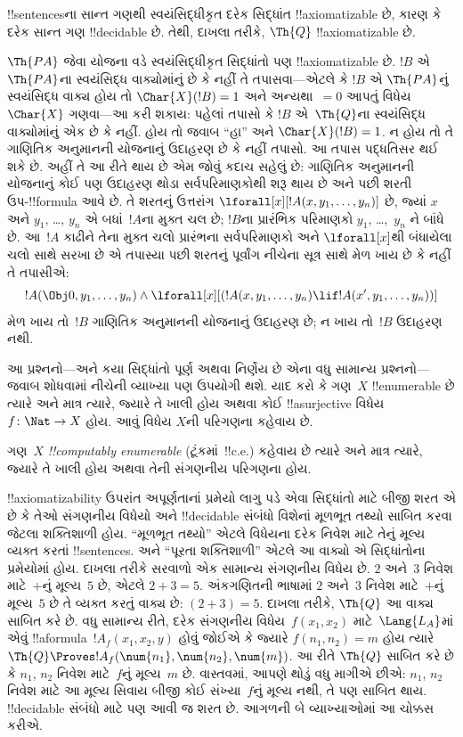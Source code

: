 \documentclass[../../../include/open-logic-section]{subfiles}
\begin{document}
\begin{ex}
!!{sentence}sના સાન્ત ગણથી સ્વયંસિદ્ધીકૃત
દરેક સિદ્ધાંત !!{axiomatizable} છે, કારણ કે
દરેક સાન્ત ગણ !!{decidable} છે. તેથી,
દાખલા તરીકે, $\Th{Q}$ !!{axiomatizable} છે.

$\Th{PA}$ જેવા યોજના વડે સ્વયંસિદ્ધીકૃત
સિદ્ધાંતો પણ !!{axiomatizable} છે. $!B$ એ
$\Th{PA}$ના સ્વયંસિદ્ધ વાક્યોમાંનું છે કે
નહીં તે તપાસવા—એટલે કે $!B$ એ
$\Th{PA}$નું સ્વયંસિદ્ધ વાક્ય હોય તો
$\Char{X}(!B)=1$ અને અન્યથા~$=0$
આપતું વિધેય~$\Char{X}$ ગણવા—આ કરી શકાય:
પહેલાં તપાસો કે $!B$ એ~$\Th{Q}$ના
સ્વયંસિદ્ધ વાક્યોમાંનું એક છે કે નહીં.
હોય તો જવાબ ``હા'' અને
$\Char{X}(!B)=1$. ન હોય તો તે ગાણિતિક અનુમાનની
યોજનાનું ઉદાહરણ છે કે નહીં તપાસો. આ
તપાસ પદ્ધતિસર થઈ શકે છે. અહીં તે આ રીતે
થાય છે એમ જોવું કદાચ સહેલું છે: ગાણિતિક અનુમાનની
યોજનાનું કોઈ પણ ઉદાહરણ થોડા સર્વપરિમાણકોથી
શરૂ થાય છે અને પછી શરતી ઉપ-!!{formula}
આવે છે. તે શરતનું ઉત્તરાંગ
$\lforall[x][!A(x, y_1, \dots, y_n)]$
છે, જ્યાં $x$ અને $y_1$, \dots, $y_n$
એ બધાં~$!A$ના મુક્ત ચલ છે; $!B$ના
પ્રારંભિક પરિમાણકો $y_1$, \dots,~$y_n$
ને બાંધે છે. આ~$!A$ કાઢીને તેના મુક્ત
ચલો પ્રારંભના સર્વપરિમાણકો અને
$\lforall[x]$થી બંધાયેલા ચલો સાથે સરખા
છે એ તપાસ્યા પછી શરતનું પૂર્વાંગ
નીચેના સૂત્ર સાથે મેળ ખાય છે કે નહીં
તે તપાસીએ:
\[
!A(\Obj 0, y_1, \dots, y_n) \land \lforall[x][(!A(x, y_1, \dots, y_n)
\lif !A(x', y_1, \dots, y_n))]
\]
મેળ ખાય તો~$!B$ ગાણિતિક અનુમાનની યોજનાનું
ઉદાહરણ છે; ન ખાય તો~$!B$ ઉદાહરણ નથી.
\end{ex}

આ પ્રશ્નનો—અને કયા સિદ્ધાંતો પૂર્ણ અથવા
નિર્ણેય છે એના વધુ સામાન્ય પ્રશ્નનો—જવાબ
શોધવામાં નીચેની વ્યાખ્યા પણ ઉપયોગી થશે.
યાદ કરો કે ગણ~$X$ !!{enumerable} છે ત્યારે
અને માત્ર ત્યારે, જ્યારે તે ખાલી હોય અથવા
કોઈ !!a{surjective} વિધેય
$f \colon \Nat \to X$ હોય. આવું વિધેય
$X$ની પરિગણના કહેવાય છે.

\begin{defn}
ગણ~$X$ \emph{!!{computably enumerable}}
(ટૂંકમાં~!!{c.e.}) કહેવાય છે ત્યારે અને માત્ર
ત્યારે, જ્યારે તે ખાલી હોય અથવા તેની
સંગણનીય પરિગણના હોય.
\end{defn}

!!{axiomatizability} ઉપરાંત અપૂર્ણતાનાં
પ્રમેયો લાગુ પડે એવા સિદ્ધાંતો માટે બીજી શરત
એ છે કે તેઓ સંગણનીય વિધેયો અને
!!{decidable} સંબંધો વિશેનાં મૂળભૂત તથ્યો
સાબિત કરવા જેટલા શક્તિશાળી હોય. ``મૂળભૂત
તથ્યો'' એટલે વિધેયના દરેક નિવેશ માટે તેનું
મૂલ્ય વ્યક્ત કરતાં !!{sentence}s. અને
``પૂરતા શક્તિશાળી'' એટલે આ વાક્યો એ
સિદ્ધાંતોના પ્રમેયોમાં હોય. દાખલા તરીકે
સરવાળો એક સામાન્ય સંગણનીય વિધેય છે.
$2$ અને~$3$ નિવેશ માટે~$+$નું મૂલ્ય~$5$
છે, એટલે $2+3=5$. અંકગણિતની ભાષામાં
$2$ અને~$3$ નિવેશ માટે~$+$નું મૂલ્ય~$5$
છે તે વ્યક્ત કરતું વાક્ય છે:
$(\num{2} + \num{3}) = \num{5}$.
દાખલા તરીકે, $\Th{Q}$ આ વાક્ય સાબિત
કરે છે. વધુ સામાન્ય રીતે, દરેક સંગણનીય
વિધેય~$f(x_1, x_2)$ માટે~$\Lang{L_A}$માં
એવું !!a{formula}~$!A_f(x_1, x_2, y)$
હોવું જોઈએ કે જ્યારે $f(n_1, n_2)=m$
હોય ત્યારે $\Th{Q} \Proves
!A_f(\num{n_1}, \num{n_2}, \num{m})$.
આ રીતે $\Th{Q}$ સાબિત કરે છે કે
$n_1$, $n_2$ નિવેશ માટે~$f$નું મૂલ્ય~$m$
છે. વાસ્તવમાં, આપણે થોડું વધુ માગીએ છીએ:
$n_1$, $n_2$ નિવેશ માટે આ મૂલ્ય સિવાય
બીજી કોઈ સંખ્યા~$f$નું મૂલ્ય નથી, તે પણ
સાબિત થાય.
!!{decidable} સંબંધો માટે પણ આવી જ શરત
છે. આગળની બે વ્યાખ્યાઓમાં આ ચોક્કસ કરીએ.
\end{document}
